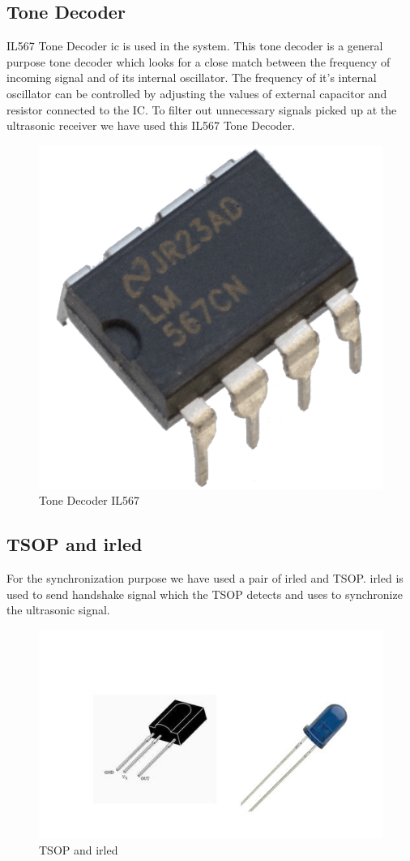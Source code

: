 \subsection{Tone Decoder}
IL567 Tone Decoder \gls{ic} is used in the system. This tone decoder is a general purpose tone decoder which looks for a close match between the frequency of incoming signal and of its internal oscillator. The frequency of it's internal oscillator can be controlled by adjusting the values of external capacitor and resistor connected to the IC. To filter out unnecessary signals picked up at the ultrasonic receiver we have used this IL567 Tone Decoder.
\begin{figure}[h!]
	\centering
	\includegraphics[scale=0.2]{Images/IL567.png}
	\caption{Tone Decoder IL567}
	\label{fig:IL567}
\end{figure}

\subsection{TSOP and \gls{irled}}
For the synchronization purpose we have used a pair of \gls{irled} and TSOP. \gls{irled} is used to send handshake signal which the TSOP detects and uses to synchronize the ultrasonic signal.

\begin{figure}[h!]
	\centering
	\includegraphics[scale=0.5]{Images/TSOPandIRLED.png}
	\caption{TSOP and \gls{irled}}
	\label{fig:TSOPandIRLED}
\end{figure}
